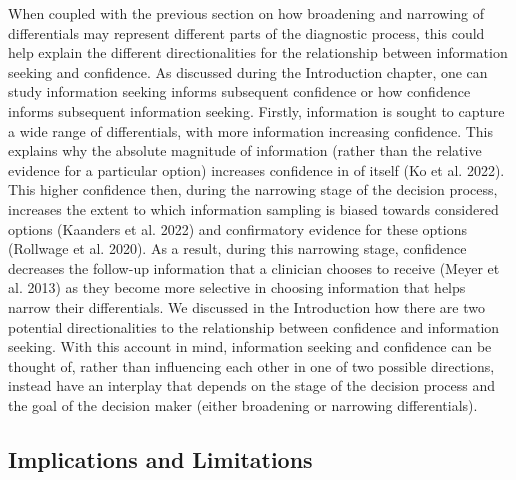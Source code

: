 \documentclass[a4paper, nobind]{templates/ociamthesis}
\begin{document}
When coupled with the previous section on how broadening and narrowing of differentials may represent different parts of the diagnostic process, this could help explain the different directionalities for the relationship between information seeking and confidence. As discussed during the Introduction chapter, one can study information seeking informs subsequent confidence or how confidence informs subsequent information seeking. Firstly, information is sought to capture a wide range of differentials, with more information increasing confidence. This explains why the absolute magnitude of information (rather than the relative evidence for a particular option) increases confidence in of itself (Ko et al. 2022). This higher confidence then, during the narrowing stage of the decision process, increases the extent to which information sampling is biased towards considered options (Kaanders et al. 2022) and confirmatory evidence for these options (Rollwage et al. 2020). As a result, during this narrowing stage, confidence decreases the follow-up information that a clinician chooses to receive (Meyer et al. 2013) as they become more selective in choosing information that helps narrow their differentials. We discussed in the Introduction how there are two potential directionalities to the relationship between confidence and information seeking. With this account in mind, information seeking and confidence can be thought of, rather than influencing each other in one of two possible directions, instead have an interplay that depends on the stage of the decision process and the goal of the decision maker (either broadening or narrowing differentials).

\subsection{Implications and Limitations}\label{implications-and-limitations}
\end{document}

